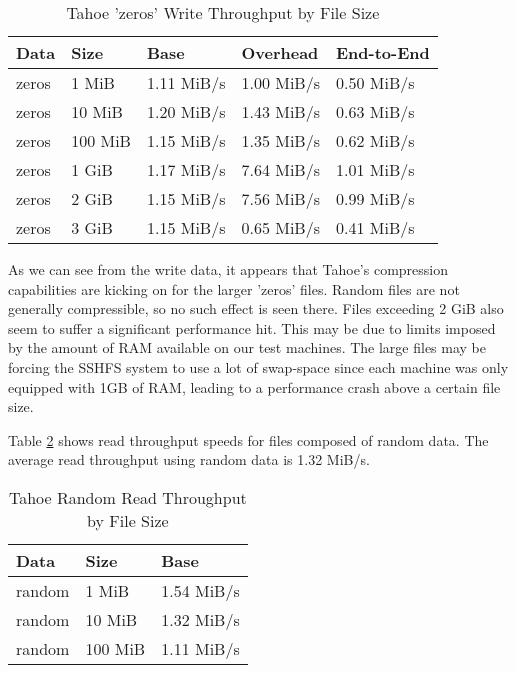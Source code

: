 \documentclass[11pt]{article}
\begin{document}
\begin{table}
  \begin{center}
    \begin{tabularx}{\textwidth}{|X|X|X|X|X|}
      \hline
      {\bf Data} & {\bf Size} & {\bf Base} & {\bf Overhead} & {\bf End-to-End} \\ \hline
      zeros & 1 MiB & 1.11 MiB/s & 1.00 MiB/s & 0.50 MiB/s \\ \hline
      zeros & 10 MiB & 1.20 MiB/s & 1.43 MiB/s & 0.63 MiB/s \\ \hline
      zeros & 100 MiB & 1.15 MiB/s & 1.35 MiB/s & 0.62 MiB/s \\ \hline
      zeros & 1 GiB & 1.17 MiB/s & 7.64 MiB/s & 1.01 MiB/s \\ \hline
      zeros & 2 GiB & 1.15 MiB/s & 7.56 MiB/s & 0.99 MiB/s \\ \hline
      zeros & 3 GiB & 1.15 MiB/s & 0.65 MiB/s & 0.41 MiB/s \\ \hline
    \end{tabularx}
    \caption{Tahoe 'zeros' Write Throughput by File Size}
    \label{tbl:TahoeWriteZeros}
  \end{center}
\end{table}

As we can see from the write data, it appears that Tahoe's compression
capabilities are kicking on for the larger 'zeros' files. Random files
are not generally compressible, so no such effect is seen there.
Files exceeding 2 GiB
also seem to suffer a significant performance hit. This may be due to
limits imposed by the amount of RAM available on our test
machines. The large files may be forcing the SSHFS system to use a lot of
swap-space since each machine was only equipped with 1GB of RAM, leading
to a performance crash above a certain file size.

Table \ref{tbl:TahoeReadRandom} shows read throughput speeds for files
composed of random data. The average read throughput using
random data is 1.32 MiB/s.

\begin{table}
  \begin{center}
    \begin{tabularx}{\textwidth}{|X|X|X|}
      \hline
      {\bf Data} & {\bf Size} & {\bf Base} \\ \hline
      random & 1 MiB & 1.54 MiB/s \\ \hline
      random & 10 MiB & 1.32 MiB/s \\ \hline
      random & 100 MiB & 1.11 MiB/s \\ \hline
    \end{tabularx}
    \caption{Tahoe Random Read Throughput by File Size}
    \label{tbl:TahoeReadRandom}
  \end{center}
\end{table}
\end{document}
